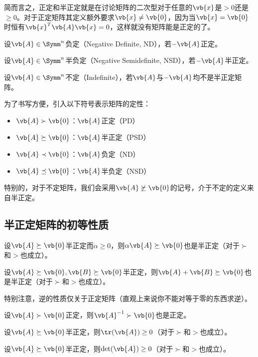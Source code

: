 简而言之，正定和半正定就是在讨论矩阵的二次型对于任意的$\vb{x}$是$>0$还是$\geq 0$。对于正定矩阵其定义额外要求$\vb{x}\neq\vb{0}$，因为当$\vb{x}=\vb{0}$时恒有$\vb{x}^T\vb{A}\vb{x}=0$，这样就没有矩阵能是正定的了。

\begin{BoxDefinition}[负定矩阵]
    设$\vb{A}\in\Symm^n$负定（Negative Definite, ND），若$-\vb{A}$正定。
\end{BoxDefinition}

\begin{BoxDefinition}[半负定矩阵]
    设$\vb{A}\in\Symm^n$半负定（Negative Semidefinite, NSD），若$-\vb{A}$半正定。
\end{BoxDefinition}

\begin{BoxDefinition}[不定矩阵]
    设$\vb{A}\in\Symm^n$不定（Indefinite），若$\vb{A}$与$-\vb{A}$均不是半正定矩阵。
\end{BoxDefinition}

为了书写方便，引入以下符号表示矩阵的定性：
\begin{itemize}
    \item $\vb{A}\succ\vb{0}$：$\vb{A}$正定（PD）
    \item $\vb{A}\succeq\vb{0}$：$\vb{A}$半正定（PSD）
    \item $\vb{A}\prec\vb{0}$：$\vb{A}$负定（ND）
    \item $\vb{A}\preceq\vb{0}$：$\vb{A}$半负定（NSD）
\end{itemize}

特别的，对于不定矩阵，我们会采用$\vb{A}\not\succeq\vb{0}$的记号，介于不定的定义来自半正定。

\subsection{半正定矩阵的初等性质}

\begin{BoxProperty}[半正定矩阵的数乘]
    设$\vb{A}\succeq\vb{0}$半正定而$\alpha\geq 0$，则$\alpha\vb{A}\succeq\vb{0}$也是半正定（对于$\succ$和$>$也成立）。
\end{BoxProperty}

\begin{BoxProperty}[半正定矩阵的相加]
    设$\vb{A}\succeq\vb{0},\vb{B}\succeq\vb{0}$半正定，则$\vb{A}+\vb{B}\succeq\vb{0}$也是半正定（对于$\succ$和$>$也成立）。
\end{BoxProperty}

特别注意，逆的性质仅关于正定矩阵（直观上来说你不能对等于零的东西求逆）。

\begin{BoxProperty}[正定矩阵的逆]
    设$\vb{A}\succ\vb{0}$正定，则$\vb{A}^{-1}\succ\vb{0}$也是正定。
\end{BoxProperty}

\begin{BoxProperty}[半正定矩阵的迹]
    设$\vb{A}\succeq\vb{0}$半正定，则$\tr(\vb{A})\geq 0$（对于$\succ$和$>$也成立）。
\end{BoxProperty}

\begin{BoxProperty}[半正定矩阵的行列式]
    设$\vb{A}\succeq\vb{0}$半正定，则$\det(\vb{A})\geq 0$（对于$\succ$和$>$也成立）。
\end{BoxProperty}
